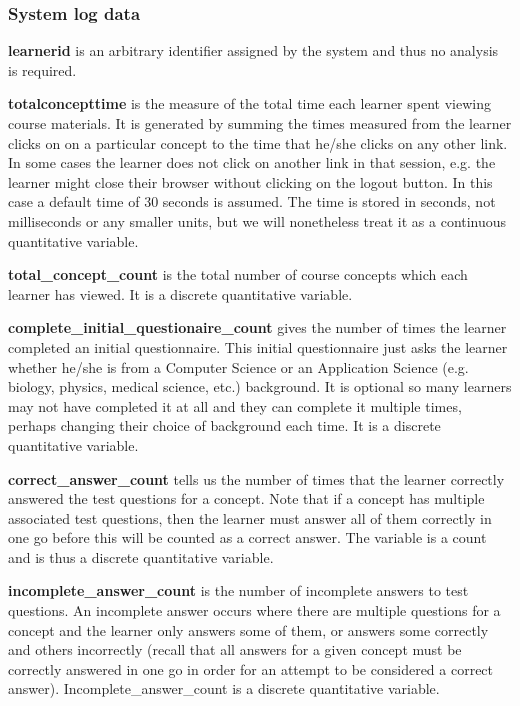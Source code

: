 \documentclass[12pt,twoside]{article}
\begin{document}
\subsubsection[System log data]{\rmfamily\bfseries System log data}
\textbf{learnerid} is an arbitrary identifier assigned by the system and
thus no analysis is required. 

\textbf{totalconcepttime} is the measure of the total time each learner
spent viewing course materials. It is generated by summing the times
measured from the learner clicks on on a particular concept to the time
that he/she clicks on any other link. In some cases the learner does
not click on another link in that session, e.g. the learner might close
their browser without clicking on the logout button. In this case a
default time of 30 seconds is assumed. The time is stored in seconds,
not milliseconds or any smaller units, but we will nonetheless treat it
as a continuous quantitative variable. 

\textbf{total\_concept\_count} is the total number of course concepts
which each learner has viewed. It is a discrete quantitative variable. 

\textbf{complete\_initial\_questionaire\_count} gives the number of
times the learner completed an initial questionnaire. This initial
questionnaire just asks the learner whether he/she is from a Computer
Science or an Application Science (e.g. biology, physics, medical
science, etc.) background. It is optional so many learners may not have
completed it at all and they can complete it multiple times, perhaps
changing their choice of background each time. It is a discrete
quantitative variable. 

\textbf{correct\_answer\_count} tells us the number of times that the
learner correctly answered the test questions for a concept. Note that
if a concept has multiple associated test questions, then the learner
must answer all of them correctly in one go before this will be counted
as a correct answer. The variable is a count and is thus a discrete
quantitative variable. 

\textbf{incomplete\_answer\_count} is the number of incomplete answers
to test questions. An incomplete answer occurs where there are multiple
questions for a concept and the learner only answers some of them, or
answers some correctly and others incorrectly (recall that all answers
for a given concept must be correctly answered in one go in order for
an attempt to be considered a correct answer).
Incomplete\_answer\_count is a discrete quantitative variable. 
\end{document}
